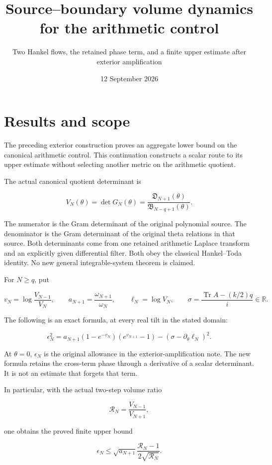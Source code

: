 \documentclass[
  11pt,
]{article}
\title{Source--boundary volume dynamics for the arithmetic control}
\subtitle{Two Hankel flows, the retained phase term, and a finite upper
estimate after exterior amplification}
\author{}
\date{12 September 2026}
\begin{document}
\maketitle

{
\setcounter{tocdepth}{3}
\tableofcontents
}
\section{Results and scope}\label{results-and-scope}

The preceding exterior construction proves an aggregate lower bound on
the canonical arithmetic control. This continuation constructs a scalar
route to its upper estimate without selecting another metric on the
arithmetic quotient.

The actual canonical quotient determinant is

\[
V_N(\theta)=\det G_N(\theta)
=\frac{\mathfrak D_{N+1}(\theta)}{\mathfrak B_{N-q+1}(\theta)}.
\tag{1}
\]

The numerator is the Gram determinant of the original polynomial source.
The denominator is the Gram determinant of the original theta relations
in that source. Both determinants come from one retained arithmetic
Laplace transform and an explicitly given differential filter. Both obey
the classical Hankel--Toda identity. No new general integrable-system
theorem is claimed.

For \(N\ge q\), put

\[
 v_N=\log\frac{V_{N-1}}{V_N},\qquad
 a_{N+1}=\frac{\omega_{N+1}}{\omega_N},\qquad
 \ell_N=\log V_N,\qquad
 \sigma=\frac{\operatorname{Tr}A-(k/2)q}{i}\in\mathbb R.
\]

The following is an exact formula, at every real tilt in the stated
domain:

\[
\boxed{
\epsilon_N^2
=a_{N+1}(1-e^{-v_N})(e^{v_{N+1}}-1)
-(\sigma-\partial_\theta\ell_N)^2.
}
\tag{2}
\]

At \(\theta=0\), \(\epsilon_N\) is the original allowance in the
exterior-amplification note. The new formula retains the cross-term
phase through a derivative of a scalar determinant. It is not an
estimate that forgets that term.

In particular, with the actual two-step volume ratio

\[
\mathcal R_N=\frac{V_{N-1}}{V_{N+1}},
\]

one obtains the proved finite upper bound

\[
\boxed{
\epsilon_N\le
\sqrt{a_{N+1}}\frac{\mathcal R_N-1}{2\sqrt{\mathcal R_N}}.
}
\tag{3}
\]
\end{document}

